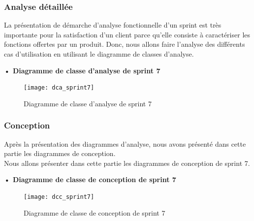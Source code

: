 \subsubsection{Analyse détaillée}
La présentation de démarche d'analyse fonctionnelle d'un sprint est très importante pour la satisfaction d'un client parce qu'elle consiste à caractériser les fonctions offertes par un produit.
Donc, nous allons faire l'analyse des différents cas d'utilisation en utilisant le diagramme de classes d'analyse.


\setlength{\parskip}{1em}
\setlength{\parindent}{0em}

\textbf{•	Diagramme de classe d'analyse de sprint 7 }


\begin{figure}[H]
  \centering
  \texttt{[image: dca\_sprint7]}
  \caption{Diagramme de classe d'analyse de sprint 7}
  \label{fig:class_analyse_sprint7}
\end{figure}


\subsubsection{Conception}

Après la présentation des diagrammes d'analyse, nous avons présenté dans cette partie les diagrammes de conception.\\ 
Nous allons présenter dans cette partie les diagrammes de conception de sprint 7. \\
\begin{landscape}

\textbf{•	Diagramme de classe de conception de sprint 7}

\begin{figure}[H]
  \centering
  \texttt{[image: dcc\_sprint7]}
  \caption{Diagramme de classe de conception de sprint 7}
  \label{fig:class_diagram_5}
\end{figure}
\end{landscape}


